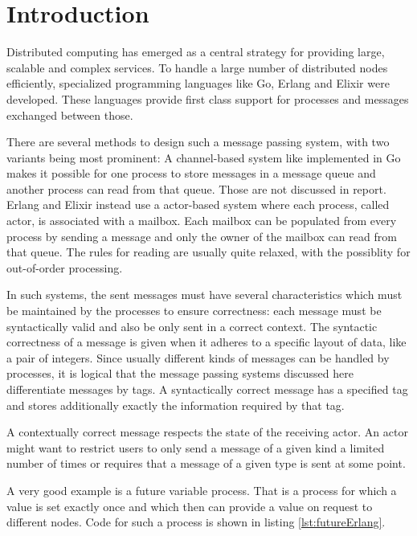 
\begin{abstract}

\end{abstract}



\section{Introduction}
\label{sec:introduction}

Distributed computing has emerged as a central strategy for providing large, scalable and complex services. To handle a large number of distributed nodes efficiently, specialized programming languages like Go, Erlang and Elixir were developed. These languages provide first class support for processes and messages exchanged between those.

There are several methods to design such a message passing system, with two variants being most prominent: A channel-based system like implemented in Go makes it possible for one process to store messages in a message queue and another process can read from that queue. Those are not discussed in report. Erlang and Elixir instead use a actor-based system where each process, called actor, is associated with a mailbox. Each mailbox can be populated from every process by sending a message and only the owner of the mailbox can read from that queue. The rules for reading are usually quite relaxed, with the possiblity for out-of-order processing.

In such systems, the sent messages must have several characteristics which must be maintained by the processes to ensure correctness: each message must be syntactically valid and also be only sent in a correct context. The syntactic correctness of a message is given when it adheres to a specific layout of data, like a pair of integers. Since usually different kinds of messages can be handled by processes, it is logical that the message passing systems discussed here differentiate messages by tags. A syntactically correct message has a specified tag and stores additionally exactly the information required by that tag. 

A contextually correct message respects the state of the receiving actor. An actor might want to restrict users to only send a message of a given kind a limited number of times or requires that a message of a given type is sent at some point. 


A very good example is a future variable process. That is a process for which a value is set exactly once and which then can provide a value on request to different nodes. Code for such a process is shown in listing \ref{lst:futureErlang}.


